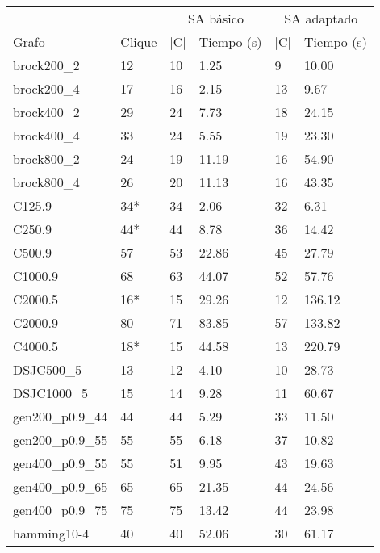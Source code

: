 \begin{small}
\begin{longtable}{l l l l l l}
  \label{table:sa}\\
    & & \multicolumn{2}{c}{SA básico} & \multicolumn{2}{c}{SA adaptado} \\ \cline{3-6}
    Grafo              & Clique & |C| & Tiempo (s) & |C| & Tiempo (s) \\ \hline
    \endhead
    \endfoot
    brock200\_2        & 12 & 10 & 1.25 & 9 & 10.00 \\ \hline
    brock200\_4        & 17 & 16 & 2.15 & 13 & 9.67 \\ \hline
    brock400\_2        & 29 & 24 & 7.73 & 18 & 24.15 \\ \hline
    brock400\_4        & 33 & 24 & 5.55 & 19 & 23.30 \\ \hline
    brock800\_2        & 24 & 19 & 11.19 & 16 & 54.90 \\ \hline
    brock800\_4        & 26 & 20 & 11.13 & 16 & 43.35 \\ \hline
    C125.9             & 34* & 34 & 2.06 & 32 & 6.31 \\ \hline
    C250.9             & 44* & 44 & 8.78 & 36 & 14.42 \\ \hline
    C500.9             & 57 & 53 & 22.86 & 45 & 27.79 \\ \hline
    C1000.9            & 68 & 63 & 44.07 & 52 & 57.76 \\ \hline
    C2000.5            & 16* & 15 & 29.26 & 12 & 136.12 \\ \hline
    C2000.9            & 80 & 71 & 83.85 & 57 & 133.82 \\ \hline
    C4000.5            & 18* & 15 & 44.58 & 13 & 220.79 \\ \hline
    DSJC500\_5         & 13 & 12 & 4.10 & 10 & 28.73 \\ \hline
    DSJC1000\_5        & 15 & 14 & 9.28 & 11 & 60.67 \\ \hline
    gen200\_p0.9\_44   & 44 & 44 & 5.29 & 33 & 11.50 \\ \hline
    gen200\_p0.9\_55   & 55 & 55 & 6.18 & 37 & 10.82 \\ \hline
    gen400\_p0.9\_55   & 55 & 51 & 9.95 & 43 & 19.63 \\ \hline
    gen400\_p0.9\_65   & 65 & 65 & 21.35 & 44 & 24.56 \\ \hline
    gen400\_p0.9\_75   & 75 & 75 & 13.42 & 44 & 23.98 \\ \hline
    hamming10-4        & 40 & 40 & 52.06 & 30 & 61.17 \\ \hline

\end{longtable}
\end{small}
